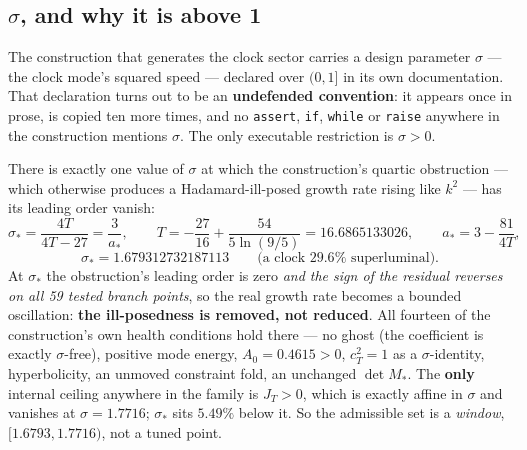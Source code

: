 \documentclass[11pt,letterpaper]{article}
\begin{document}
\subsection{$\sigma$, and why it is above 1}
The construction that generates the clock sector carries a design parameter $\sigma$ --- the clock mode's squared speed --- declared over $(0,1]$ in its own documentation. That declaration turns out to be an \textbf{undefended convention}: it appears once in prose, is copied ten more times, and no \texttt{assert}, \texttt{if}, \texttt{while} or \texttt{raise} anywhere in the construction mentions $\sigma$. The only executable restriction is $\sigma>0$.

There is exactly one value of $\sigma$ at which the construction's quartic obstruction --- which otherwise produces a Hadamard-ill-posed growth rate rising like $k^2$ --- has its leading order vanish:
\begin{equation}
\sigma_*=\frac{4T}{4T-27}=\frac{3}{a_*},\qquad T=-\frac{27}{16}+\frac{54}{5\ln(9/5)}=16.6865133026,\qquad a_*=3-\frac{81}{4T},
\end{equation}
\begin{equation}
\sigma_*=1.679312732187113\qquad\text{(a clock $29.6\%$ superluminal).}
\end{equation}
At $\sigma_*$ the obstruction's leading order is zero \emph{and the sign of the residual reverses on all 59 tested branch points}, so the real growth rate becomes a bounded oscillation: \textbf{the ill-posedness is removed, not reduced}. All fourteen of the construction's own health conditions hold there --- no ghost (the coefficient is exactly $\sigma$-free), positive mode energy, $A_0=0.4615>0$, $c_T^2=1$ as a $\sigma$-identity, hyperbolicity, an unmoved constraint fold, an unchanged $\det M_*$. The \textbf{only} internal ceiling anywhere in the family is $J_T>0$, which is exactly affine in $\sigma$ and vanishes at $\sigma=1.7716$; $\sigma_*$ sits $5.49\%$ below it. So the admissible set is a \emph{window}, $[1.6793,1.7716)$, not a tuned point.
\end{document}
